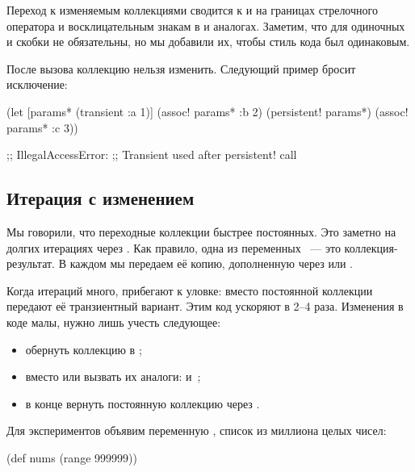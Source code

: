 \fi

Переход к изменяемым коллекциями сводится к  и
 на границах стрелочного оператора и восклицательным знакам в
 и аналогах. Заметим, что для одиночных  и
 скобки не обязательны, но мы добавили их, чтобы стиль кода
был одинаковым.

После вызова  коллекцию нельзя изменить. Следующий пример
бросит исключение:

\begin{clojure}
(let [params* (transient {:a 1})]
  (assoc! params* :b 2)
  (persistent! params*)
  (assoc! params* :c 3))

;; IllegalAccessError:
;; Transient used after persistent! call
\end{clojure}

\subsection{Итерация с изменением}


Мы говорили, что переходные коллекции быстрее постоянных. Это заметно на долгих
итерациях через . Как правило, одна из переменных
~--- это коллекция-результат. В каждом  мы передаем её
копию, дополненную через  или .

Когда итераций много, прибегают к уловке: вместо постоянной коллекции передают
её транзиентный вариант. Этим код ускоряют в 2--4 раза. Изменения в коде малы,
нужно лишь учесть следующее:

\begin{itemize}

\item
  обернуть коллекцию в ;

\item
  вместо  или  вызвать их аналоги: 
  и~;

\item
  в конце вернуть постоянную коллекцию через .

\end{itemize}

Для экспериментов объявим переменную , список из миллиона целых
чисел:

\begin{clojure}
(def nums (range 999999))
\end{clojure}

